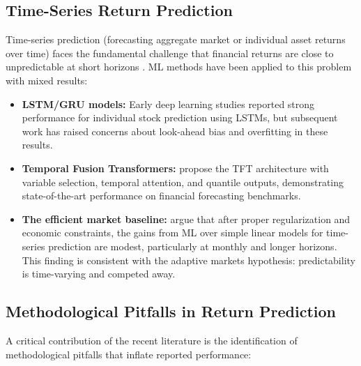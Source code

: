 \subsection{Time-Series Return Prediction}

Time-series prediction (forecasting aggregate market or individual asset returns over time) faces the fundamental challenge that financial returns are close to unpredictable at short horizons \citep{Welch2008}. ML methods have been applied to this problem with mixed results:

\begin{itemize}[leftmargin=*]
    \item \textbf{LSTM/GRU models:} Early deep learning studies \citep{Fischer2018, Bao2017} reported strong performance for individual stock prediction using LSTMs, but subsequent work has raised concerns about look-ahead bias and overfitting in these results.

    \item \textbf{Temporal Fusion Transformers:} \citet{Lim2021} propose the TFT architecture with variable selection, temporal attention, and quantile outputs, demonstrating state-of-the-art performance on financial forecasting benchmarks.

    \item \textbf{The efficient market baseline:} \citet{Avramov2023} argue that after proper regularization and economic constraints, the gains from ML over simple linear models for time-series prediction are modest, particularly at monthly and longer horizons. This finding is consistent with the adaptive markets hypothesis: predictability is time-varying and competed away.
\end{itemize}

\subsection{Methodological Pitfalls in Return Prediction}

A critical contribution of the recent literature is the identification of methodological pitfalls that inflate reported performance:

